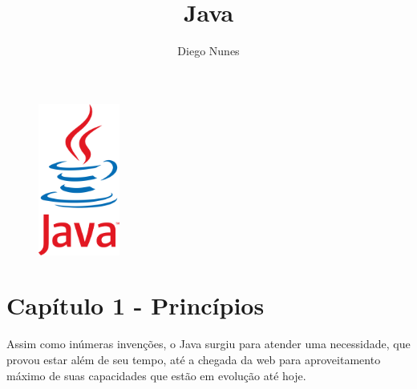 \documentclass{article}
\begin{document}
\begin{figure}
    \centering
    \includegraphics[height=5cm]{imagens/logo_java_com_nome.png}
    \label{fig:imagem}
\end{figure}

\newpage

\title{Java}
\author{Diego Nunes}
\maketitle
\thispagestyle{empty}

\newpage

\thispagestyle{empty} %
\tableofcontents

\setcounter{page}{1}

\newpage
\section{Capítulo 1 - Princípios}

Assim como inúmeras invenções, o Java surgiu para atender uma necessidade, que provou estar além de seu tempo, até a chegada da web para aproveitamento máximo de suas capacidades que estão em evolução até hoje. 
\end{document}
